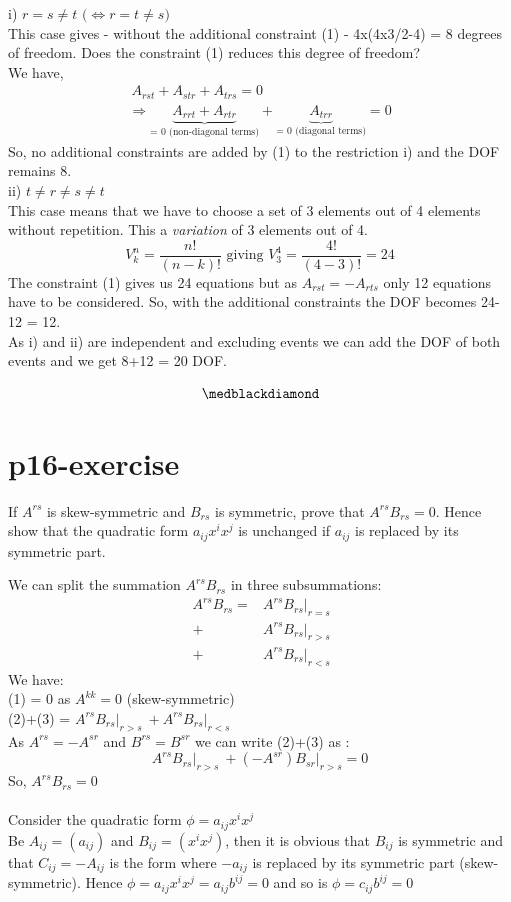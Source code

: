 i) $r=s\neq t \text{ (}\Leftrightarrow r=t\neq s \text{)}$\\
This case gives - without the additional constraint (1) -  4x(4x3/2-4) = 8 degrees of freedom.
Does the constraint (1) reduces this degree of freedom?\\
We have, 
\begin{align}
\ A_{rst} + A_{str}+A_{trs} =0\\
\Rightarrow \underbrace{A_{rrt} + A_{rtr}}_\text{= 0 (non-diagonal terms)} + \underbrace{A_{trr}}_\text{= 0 (diagonal terms)} =0
\end{align}
So, no additional constraints are added by (1) to the restriction i) and the DOF remains 8.\\

ii) $t \neq r\neq s\neq t$\\
This case means that we have to choose a set of 3 elements out of 4 elements without repetition. This a \textit{variation} of 3 elements out of 4.
$$V^n_{k} = \frac{n!}{(n-k)!} \text{ giving } V^4_{3} = \frac{4!}{(4-3)!} = 24 $$
The constraint (1) gives us 24 equations but as  $A_{rst} = -A_{rts}$ only 12 equations have to be considered. So, with the  additional constraints the DOF becomes 24-12 = 12.\\
As i) and ii) are independent and excluding events we can add the DOF of both events and we get 8+12 = 20 DOF.

$$\medblackdiamond$$
\pagebreak[4]

\section{p16-exercise}

\begin{tcolorbox}
If $A^{rs}$ is skew-symmetric and $B_{rs}$ is symmetric, prove that $A^{rs}B_{rs} = 0$. Hence show that the quadratic form $a_{ij}x^ix^j$ is unchanged if $a_{ij}$ is replaced by its symmetric part.
\end{tcolorbox}
We can split the summation $A^{rs}B_{rs}$ in three subsummations:
\begin{align}
\ A^{rs}B_{rs}  = &A^{rs}B_{rs} \vert_{r=s} \\
\ + &A^{rs}B_{rs}\vert_{r>s} \\
\ + &A^{rs}B_{rs}\vert_{r<s}
\end{align}
We have:\\
(1) = 0 as $A^{kk} = 0$ (skew-symmetric)\\
(2)+(3) = $A^{rs}B_{rs}\vert_{r>s} \ + A^{rs}B_{rs}\vert_{r<s}$\\
As $A^{rs} = -A^{sr}$ and $B^{rs} = B^{sr}$ we can write (2)+(3) as :
$$A^{rs}B_{rs}\vert_{r>s} \ + (-A^{sr})B_{sr}\vert_{r>s} = 0$$
So, $A^{rs}B_{rs} = 0$\\\\
Consider the quadratic form $\phi = a_{ij}x^ix^j$\\
Be $A_{ij} = (a_{ij})$ and $B_{ij} = (x^ix^j)$, then it is obvious that $B_{ij}$ is symmetric and that $C_{ij} = -A_{ij}$ is the form where $-a_{ij}$ is replaced by its symmetric part (skew-symmetric).
Hence $\phi = a_{ij}x^ix^j =a_{ij}b^{ij}= 0$ and so is $\phi = c_{ij}b^{ij}= 0$ 

